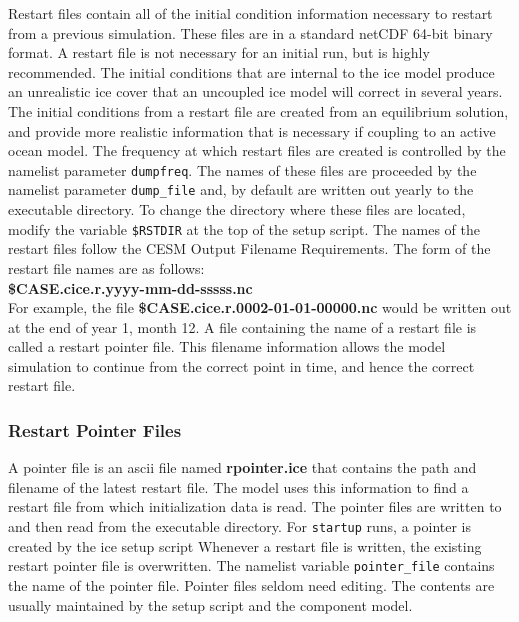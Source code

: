 
Restart files contain all of the initial condition information
necessary to restart from a previous simulation.  These files are in a
standard netCDF 64-bit binary format. A restart file is not necessary for
an initial run, but is highly recommended.  The initial conditions
that are internal to the ice model produce an unrealistic ice cover
that an uncoupled ice model will correct in several years.  The initial
conditions from a restart file are created from an equilibrium solution,
and provide more realistic information that is necessary if coupling
to an active ocean model.  The frequency at which restart files are created
is controlled by the namelist parameter {\tt dumpfreq}. 
The names of these files are proceeded by the namelist parameter 
{\tt dump\_file} and, by default are written out yearly to
the executable directory.  To change the directory where these files are
located, modify the variable {\tt \$RSTDIR} at the top of the setup script.
The names of the restart files follow the CESM Output Filename Requirements.
The form of the restart file names are as follows: \\

{\bf \$CASE.cice.r.yyyy-mm-dd-sssss.nc} \\

For example, the file {\bf \$CASE.cice.r.0002-01-01-00000.nc} would be written
out at the end of year 1, month 12.  A file containing the name of a restart
file is called a restart pointer file. This filename information allows the
model simulation to continue from the correct point in time, and hence the
correct restart file.

\subsubsection*{Restart Pointer Files}
\label{pointer_files}

A pointer file is an ascii file named {\bf rpointer.ice} that contains the
path and filename of the latest restart file. The model uses this information to find
a restart file from which initialization data is read.  The pointer files are
written to and then read from the executable directory. For 
{\tt startup} runs, a pointer is created by the ice setup script 
Whenever a restart file is written, the existing restart pointer file 
is overwritten.  The namelist variable {\tt pointer\_file} contains the
name of the pointer file. Pointer files seldom need editing.  The contents
are usually maintained by the setup script and the component model. 

